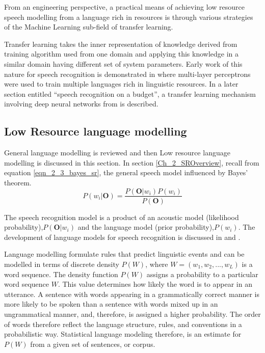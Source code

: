 From an engineering perspective, a practical means of achieving low resource speech modelling from a language rich in resources is through various strategies of the Machine Learning sub-field of transfer learning.  

Transfer learning takes the inner representation of knowledge derived from training algorithm used from one domain and applying this knowledge in a similar domain having different set of system parameters. Early work of this nature for speech recognition is demonstrated in \citep{vu2013multilingual} where multi-layer perceptrons were used to train multiple languages rich in linguistic resources. In a later section entitled “speech recognition on a budget”, a transfer learning mechanism involving deep neural networks from \citep{kunze2017transfer} is described.

\subsection{Low Resource language modelling} \label{sec_lrlm}

General language modelling is reviewed and then Low resource language modelling is discussed in this section.  In section \ref{Ch_2_SROverview}, recall from equation \ref{eqn_2_3_bayes_sr}, the general speech model influenced by Bayes' theorem.
\begin{equation}P(w_i|\mathbf{O})=\frac{P(\mathbf{O}|w_i)P(w_i)}{P(\mathbf{O})}
\label{eqn_2_5_bayes_sr}
\end{equation}

The speech recognition model is a product of an acoustic model (likelihood probability),$P(\mathbf{O}|w_i)$ and the language model (prior probability),$P(w_i)$.  The development of  language models for speech recognition is discussed in \cite{juang2000automatic} and \cite{1996YoungA}.  

Language modelling formulate rules that predict linguistic events and can be modelled in terms of discrete density $P(W)$, where  $W=(w_1, w_2,..., w_L)$ is a word sequence. The density function $P(W)$ assigns a probability to a particular word sequence $W$.  This value determines how likely the word is to appear in an utterance. A sentence with words appearing in a grammatically correct manner is more likely to be spoken than a sentence with words mixed up in an ungrammatical manner, and, therefore, is assigned a higher probability. The order of words therefore reflect the language structure, rules, and conventions in a probabilistic way. Statistical language modeling therefore, is an estimate for $P(W)$ from a given set of sentences, or corpus.

